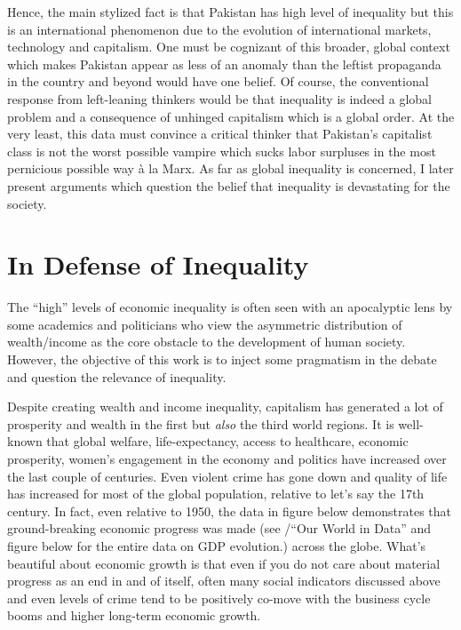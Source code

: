 \documentclass[12pt]{article}
\newcommand{\1}{\mathbbm 1}
\begin{document}
Hence, the main stylized fact is that Pakistan has high level of inequality but this is an international phenomenon due to the evolution of international markets, technology and capitalism. One must be cognizant of this broader, global context which makes Pakistan appear as less of an anomaly than the leftist propaganda in the country and beyond would have one belief. Of course, the conventional response from left-leaning thinkers would be that inequality is indeed a global problem and a consequence of unhinged capitalism which is a global order. At the very least, this data must convince a critical thinker that Pakistan's capitalist class is not the worst possible vampire which sucks labor surpluses in the most pernicious possible way \`a la Marx. As far as global inequality is concerned, I later present arguments which question the belief that inequality is devastating for the society.
		
		
		
		
		
		
		
		
		

		

			
		
		
		\section{In Defense of Inequality}
		
		
		The ``high'' levels of economic inequality is often seen with an apocalyptic lens by some academics and politicians who view the asymmetric distribution of wealth/income as the core obstacle to the development of human society. However, the objective of this work is to inject some pragmatism in the debate and question the relevance of inequality.
		
		Despite creating wealth and income inequality, capitalism has generated a lot of prosperity and wealth in the first but \textit{also} the third world regions. It is well-known that global welfare, life-expectancy, access to healthcare, economic prosperity, women's engagement in the economy and politics have increased over the last couple of centuries. Even violent crime has gone down and quality of life has increased for most of the global population, relative to let's say the 17th century. In fact, even relative to 1950, the data in figure below demonstrates that ground-breaking economic progress was made (see \cite{owid-economic-growth}/``Our World in Data'' and figure below  for the entire data on GDP evolution.) across the globe. What's beautiful about economic growth is that even if you do not care about material progress as an end in and of itself, often many social indicators discussed above and even levels of crime tend to be positively co-move with the business cycle booms and higher long-term economic growth.
		
\end{document}
